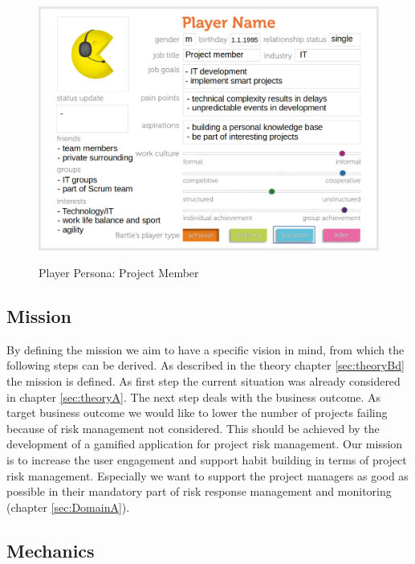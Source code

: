 \begin{figure}[H]
	\centering
	\includegraphics[width=1.0\textwidth]{Content/Domain/PersonaProjectMember.png}
	\caption{Player Persona: Project Member}
	\label{fig:personaProjectMember}
	\cite[p. 88; adapted]{kumarGamificationWorkDesigning2013}
\end{figure}


\subsection{Mission}
\label{sec:domainCb}

By defining the mission we aim to have a specific vision in mind, from which the following steps can be derived. As described in the theory chapter \ref{sec:theoryBd} the mission is defined. 
As first step the current situation was already considered  in chapter \ref{sec:theoryA}. The next step deals with the business outcome. As target business outcome we would like to lower the number of projects failing because of risk management not considered. This should be achieved by the development of a gamified application for project risk management.
Our mission is to increase the user engagement and support habit building in terms of project risk management. Especially we want to support the project managers as good as possible in their mandatory part of risk response management and monitoring (chapter \ref{sec:DomainA}).

\subsection{Mechanics}
\label{sec:domainCc}


